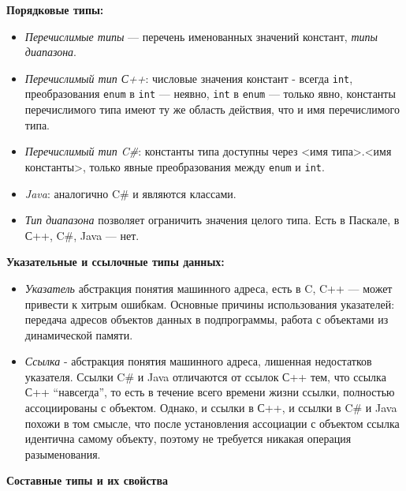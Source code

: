 \textbf{Порядковые типы:}
\begin{itemize}
    \item \textit{Перечислимые типы} --- перечень именованных значений констант, \textit{типы диапазона}.
    \item \textit{Перечислимый тип С++}: числовые значения констант - всегда \texttt{int}, преобразования \texttt{enum} в \texttt{int} --- неявно, \texttt{int} в \texttt{enum} --- только явно, константы перечислимого типа имеют ту же область действия, что и имя перечислимого типа.
    \item \textit{Перечислимый тип C\#}: константы типа доступны через <имя типа>.<имя константы>, только явные преобразования между \texttt{enum} и \texttt{int}.
    \item \textit{Java}: аналогично C\# и являются классами.
    \item \textit{Тип диапазона} позволяет ограничить значения целого типа.
    Есть в Паскале, в С++, C\#, Java --- нет.
\end{itemize}

\textbf{Указательные и ссылочные типы данных:}
\begin{itemize}
    \item \textit{Указатель} абстракция понятия машинного адреса, есть в C, C++ --- может привести к хитрым ошибкам.
    Основные причины использования указателей: передача адресов объектов данных в подпрограммы, работа с объектами из динамической памяти.
    \item \textit{Ссылка} - абстракция понятия машинного адреса, лишенная недостатков указателя.
    Ссылки C\# и Java отличаются от ссылок С++ тем, что ссылка С++ ``навсегда'', то есть в течение всего времени жизни ссылки, полностью ассоциированы с объектом.
    Однако, и ссылки в С++, и ссылки в C\# и Java похожи в том смысле, что после установления ассоциации с объектом ссылка идентична самому объекту, поэтому не требуется никакая операция разыменования.
\end{itemize}

\textbf{Составные типы и их свойства}

